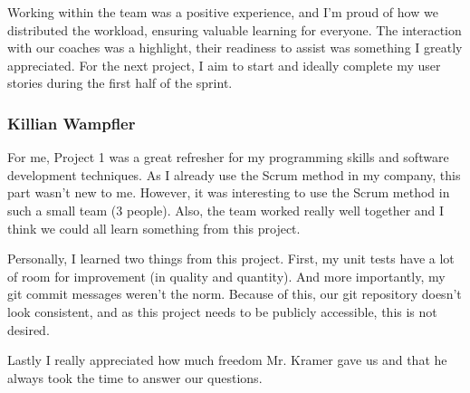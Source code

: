 Working within the team was a positive experience, and I'm proud of how we distributed the workload, ensuring valuable learning for everyone.
The interaction with our coaches was a highlight, their readiness to assist was something I greatly appreciated.
For the next project, I aim to start and ideally complete my user stories during the first half of the sprint.

\subsubsection{Killian Wampfler}
For me, Project 1 was a great refresher for my programming skills and software development techniques.
As I already use the Scrum method in my company, this part wasn't new to me.
However, it was interesting to use the Scrum method in such a small team (3 people).
Also, the team worked really well together and I think we could all learn something from this project.

Personally, I learned two things from this project.
First, my unit tests have a lot of room for improvement (in quality and quantity).
And more importantly, my git commit messages weren't the norm.
Because of this, our git repository doesn't look consistent, and as this project needs to be publicly accessible, this is not desired.

Lastly I really appreciated how much freedom Mr. Kramer gave us and that he always took the time to answer our questions.
